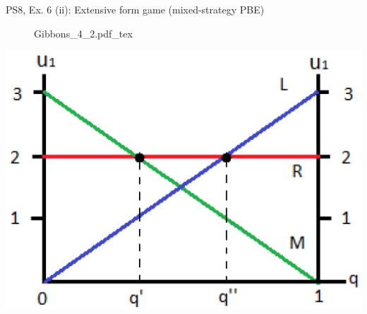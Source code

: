 \begin{frame}{PS8, Ex. 6 (ii): Extensive form game (mixed-strategy PBE)}
\begin{multicols}{2}
      \vfill\null\columnbreak
      \begin{figure}[!h]
        \center {}
        {Gibbons_4_2.pdf_tex}
      \end{figure}
      \includegraphics[width=1.1\columnwidth]{figures/Gibbons_4_2_E[u]}
      \vfill\null
    \end{multicols}
\end{frame}
